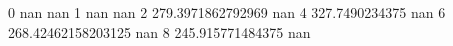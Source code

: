 0 nan nan
1 nan nan
2 279.3971862792969 nan
4 327.7490234375 nan
6 268.42462158203125 nan
8 245.915771484375 nan
